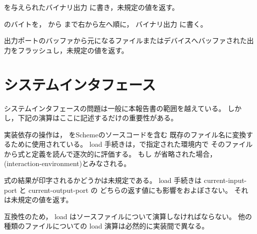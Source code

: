 \begin{entry}{%
}

 を与えられたバイナリ出力  に書き，未規定の値を返す。

\end{entry}

\begin{entry}{%
}

 のバイトを， から  まで右から左へ順に，
バイナリ出力  に書く。

\end{entry}

\begin{entry}{%
}

出力ポートのバッファから元になるファイルまたはデバイスへバッファされた出力をフラッシュし，未規定の値を返す。

\end{entry}


\section{システムインタフェース}

システムインタフェースの問題は一般に本報告書の範囲を越えている。
しかし，下記の演算はここに記述するだけの重要性がある。


\begin{entry}{%
}

実装依存の操作は， をSchemeのソースコードを含む
既存のファイル名に変換するために使用されている。
{\cf load} 手続きは，で指定された環境内で
そのファイルから式と定義を読んで逐次的に評価する。
もし  が省略された場合，{\cf (interaction-environment)}とみなされる。

式の結果が印字されるかどうかは未規定である。
{\cf load} 手続きは {\cf current-input-port} と {\cf current-output-port} の
どちらの返す値にも影響をおよぼさない。
それは未規定の値を返す。


\begin{rationale}
互換性のため，
{\cf load} はソースファイルについて演算しなければならない。
他の種類のファイルについての {\cf load} 演算は必然的に実装間で異なる。
\end{rationale}
\end{entry}

